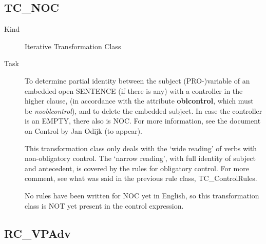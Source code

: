 \newpage
\subsection{TC\_NOC}

\begin{description}
\item[Kind] Iterative Transformation Class
\item[Task] To determine partial identity between the subject (PRO-)variable 
of an embedded open SENTENCE (if there is any) with a controller in the higher
clause, (in accordance with the attribute {\bf oblcontrol}, which must be {\em 
nooblcontrol\/}), and to delete the embedded subject. In case the controller is 
an EMPTY, there also is NOC. For more information, see the document on Control 
by Jan Odijk (to appear). 

This transformation class only deals with the `wide reading' of verbs with 
non-obligatory control. The `narrow reading', with full identity of subject and 
antecedent, is covered by the rules for obligatory control. For more comment, 
see what was said in the previous rule class, TC\_ControlRules.

No rules have been written for NOC yet in English, so this transformation class 
is NOT yet present in the control expression. 

\end{description}

\newpage
\subsection{RC\_VPAdv}

